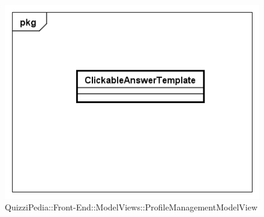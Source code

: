	\begin{figure}[ht]
		\centering
		\includegraphics[scale=0.5,keepaspectratio]{UML/Classi/Front-End/QuizziPedia_Front-end_Templates_ClickableAnswerTemplate.png}
		\caption{QuizziPedia::Front-End::ModelViews::ProfileManagementModelView}
	\end{figure} \FloatBarrier
	
